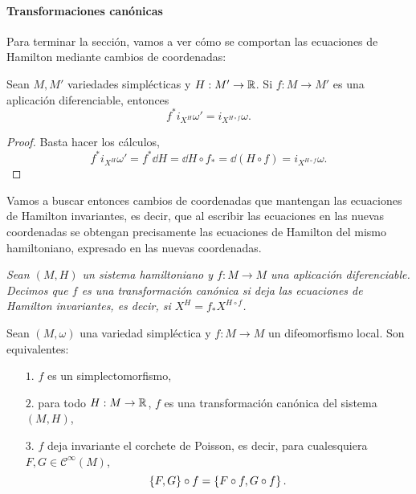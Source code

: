 \paragraph{\bf Transformaciones canónicas}\mbox{}

  Para terminar la sección, vamos a ver cómo se comportan las ecuaciones de Hamilton mediante cambios de coordenadas:
  \begin{prop}\label{cambiodif}
 Sean $M,M'$ variedades simplécticas y $H:M'\rightarrow \mathbb{R}$. Si $f:M\rightarrow M'$ es una aplicación diferenciable, entonces 
 \begin{equation*}
   f^*i_{X^H}\omega'=i_{X^{H\circ f}}\omega.
 \end{equation*}
\end{prop}
\begin{proof}
  Basta hacer los cálculos,
  \begin{equation*}
    f^*i_{X^H}\omega'=f^*\dd H=\dd H \circ f_* = \dd (H\circ f)=i_{X^{H\circ f}}\omega.
  \end{equation*}
\end{proof}
Vamos a buscar entonces cambios de coordenadas que mantengan las ecuaciones de Hamilton invariantes, es decir, que al escribir las ecuaciones en las nuevas coordenadas se obtengan precisamente las ecuaciones de Hamilton del mismo hamiltoniano, expresado en las nuevas coordenadas.
\begin{defn}
  \em
  Sean $(M,H)$ un sistema hamiltoniano y $f:M\rightarrow M$ una aplicación diferenciable. Decimos que $f$ es una \emph{transformación canónica} si deja las ecuaciones de Hamilton invariantes, es decir, si $X^H=f_*X^{H\circ f}$.
\end{defn}

\begin{prop}\label{cambiohamilton}
  Sean $(M,\omega)$ una variedad simpléctica y $f:M\rightarrow M$ un difeomorfismo local. Son equivalentes:
  \begin{enumerate}
    \item[$1$.] $f$ es un simplectomorfismo,
    \item[$2$.] para todo $H:M\rightarrow \mathbb{R}$, $f$ es una transformación canónica del sistema $(M,H)$,
    \item[$3$.] $f$ deja invariante el corchete de Poisson, es decir, para cualesquiera $F,G\in \mathscr{C}^{\infty}(M)$, 
      \begin{equation*}
	\left\lbrace F,G\right\rbrace\circ f=\left\lbrace F\circ f,G\circ f\right\rbrace.
      \end{equation*}
  \end{enumerate}
\end{prop}

